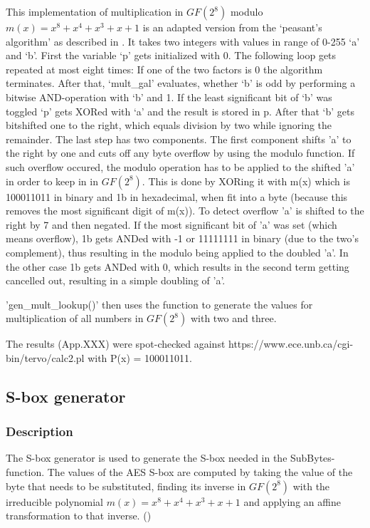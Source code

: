 This implementation of multiplication in $GF(2^{8})$ modulo $m(x) = x^8 + x^4 +
x^3 + x + 1$ is an adapted version from the `peasant's algorithm' as
described in
\cite{peasants}.
It takes two integers with values in range of 0-255 `a' and `b'. First
the variable `p' gets initialized with 0. The following loop gets
repeated at most eight times: If one of the two factors is 0 the
algorithm terminates. After that, `mult\_gal' evaluates, whether `b' is
odd by performing a bitwise AND-operation with `b' and 1. If the least
significant bit of `b' was toggled `p' gets XORed with `a' and the
result is stored in p. After that `b' gets bitshifted one to the right,
which equals division by two while ignoring the remainder. The last step
has two components.
The first component shifts 'a' to the right by one and cuts off any byte overflow
by using the modulo function. If such overflow occured, the modulo operation has to be
applied to the shifted 'a' in order to keep in in $GF(2^{8})$. This is done by XORing it 
with m(x) which is 100011011 in binary and 1b in hexadecimal, when fit into a byte (because
this removes the most significant digit of m(x)). To detect overflow 'a' is shifted to the right by 7
and then negated. If the most significant bit of 'a' was set (which means overflow), 1b gets ANDed
with -1 or 11111111 in binary (due to the two's complement), thus resulting in the modulo being applied to the doubled 'a'. In the other case 1b gets ANDed with 0, which results in the second term getting cancelled out, resulting in a simple doubling of 'a'.

'gen\_mult\_lookup()' then uses the function to generate the values for
multiplication of all numbers in $GF(2^{8})$ with two and three.

The results (App.XXX) were spot-checked against
https://www.ece.unb.ca/cgi-bin/tervo/calc2.pl with P(x) = 100011011.

\hypertarget{s-box-generator}{%
\subsection{S-box generator}\label{s-box-generator}}

\hypertarget{description-1}{%
\subsubsection{Description}\label{description-1}}

The S-box generator is used to generate the S-box needed in the
SubBytes-function.
The values of the AES S-box are computed by taking the value of the byte
that needs to be substituted, finding its inverse in $GF(2^{8})$ with the
irreducible polynomial $m(x) = x^8 + x^4 + x^3 + x + 1$ and applying an
affine transformation to that inverse. (\cite[ch 3.4.1]{rijndael})

